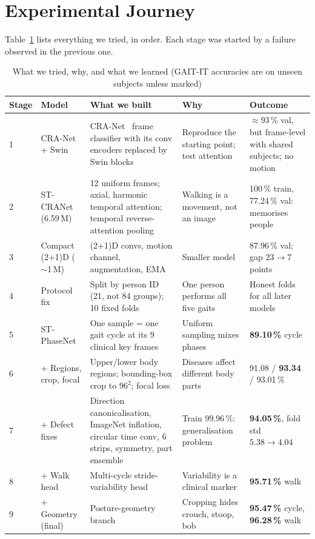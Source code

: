 \documentclass[conference]{IEEEtran}
\begin{document}
\section{Experimental Journey}
Table~\ref{tab:journey} lists everything we tried, in order. Each stage was
started by a failure observed in the previous one.

\begin{table}[!t]
\centering
\caption{What we tried, why, and what we learned (GAIT-IT accuracies are on unseen subjects unless marked)}
\label{tab:journey}
\footnotesize
\setlength{\tabcolsep}{3pt}
\begin{tabular}{@{}p{0.5cm}p{2.6cm}p{6.4cm}p{3.6cm}p{3.8cm}@{}}
\toprule
Stage & Model & What we built & Why & Outcome \\
\midrule
1 & CRA-Net + Swin & CRA-Net~\cite{bodepu_cranet} frame classifier with its conv encoders replaced by Swin blocks~\cite{liu2021swin} & Reproduce the starting point; test attention & $\approx$93\,\% val, but frame-level with shared subjects; no motion \\
2 & ST-CRANet (6.59\,M) & 12 uniform frames; axial, harmonic temporal attention; temporal reverse-attention pooling & Walking is a movement, not an image & 100\,\% train, 77.24\,\% val: memorises people \\
3 & Compact (2+1)D ($\sim$1\,M) & (2+1)D convs, motion channel, augmentation, EMA & Smaller model & 87.96\,\% val; gap 23$\rightarrow$7 points \\
4 & Protocol fix & Split by person ID (21, not 84 groups); 10 fixed folds & One person performs all five gaits & Honest folds for all later models \\
5 & ST-PhaseNet & One sample = one gait cycle at its 9 clinical key frames & Uniform sampling mixes phases & \textbf{89.10\,\%} cycle \\
6 & + Regions, crop, focal & Upper/lower body regions; bounding-box crop to $96^2$; focal loss & Diseases affect different body parts & 91.08 / \textbf{93.34} / 93.01\,\% \\
7 & + Defect fixes & Direction canonicalisation, ImageNet inflation, circular time conv, 6 strips, symmetry, part ensemble & Train 99.96\,\%: generalisation problem & \textbf{94.05\,\%}, fold std $5.38\rightarrow4.04$ \\
8 & + Walk head & Multi-cycle stride-variability head & Variability is a clinical marker & \textbf{95.71\,\%} walk \\
9 & + Geometry (final) & Posture-geometry branch & Cropping hides crouch, stoop, bob & \textbf{95.47\,\%} cycle, \textbf{96.28\,\%} walk \\
\bottomrule
\end{tabular}
\end{table}
\end{document}
